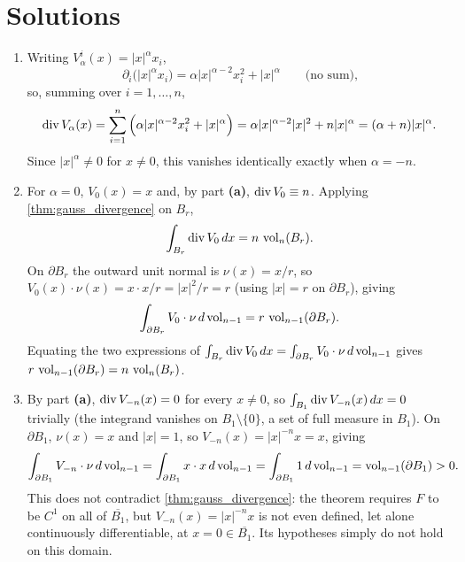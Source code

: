 
\section{Solutions}
\label{sec:flux_solutions}

\begin{exercisesolution}
\label{sol:radial_vector_fields_flux}
\begin{enumerate}[label=\textbf{(\alph*)}]
  \item Writing $V_\alpha^i(x) = \lvert x\rvert^\alpha x_i$,
    \[
    \partial_i\big(\lvert x\rvert^\alpha x_i\big) = \alpha\lvert x\rvert^{\alpha-2}x_i^2
      + \lvert x\rvert^\alpha \qquad \text{(no sum),}
    \]
    so, summing over $i=1,\ldots,n$,
    \[
    \operatorname{div} V_\alpha(x) = \sum_{i=1}^n \Big(\alpha\lvert x\rvert^{\alpha-2}x_i^2 + \lvert
      x\rvert^\alpha\Big) = \alpha\lvert x\rvert^{\alpha-2}\lvert x\rvert^2
      + n\lvert x\rvert^\alpha = (\alpha+n)\lvert x\rvert^\alpha.
    \]
    Since $\lvert x\rvert^\alpha \neq 0$ for $x\neq0$, this vanishes identically exactly when
    $\alpha = -n$.
  \item For $\alpha=0$, $V_0(x)=x$ and, by part \textbf{(a)}, $\operatorname{div} V_0 \equiv n$. Applying
    \cref{thm:gauss_divergence} on $B_r$,
    \[\int_{B_r} \operatorname{div} V_0\,dx = n\,\operatorname{vol}_n(B_r).\]
    On $\partial B_r$ the outward unit normal is $\nu(x) = x/r$, so $V_0(x)\cdot\nu(x) = x\cdot
    x/r = \lvert x\rvert^2/r = r$ (using $\lvert x\rvert=r$ on $\partial B_r$), giving
    \[\int_{\partial B_r} V_0\cdot\nu\,d\operatorname{vol}_{n-1} = r\,\operatorname{vol}_{n-1}(\partial B_r).\]
    Equating the two expressions of $\int_{B_r}\operatorname{div} V_0\,dx = \int_{\partial B_r}V_0\cdot\nu\,
    d\operatorname{vol}_{n-1}$ gives $r\,\operatorname{vol}_{n-1}(\partial B_r) = n\,\operatorname{vol}_n(B_r)$.
  \item By part \textbf{(a)}, $\operatorname{div} V_{-n}(x) = 0$ for every $x\neq0$, so $\int_{B_1}\operatorname{div}
    V_{-n}(x)\,dx = 0$ trivially (the integrand vanishes on $B_1\setminus\{0\}$, a set of full
    measure in $B_1$). On $\partial B_1$, $\nu(x)=x$ and $\lvert x\rvert=1$, so $V_{-n}(x) =
    \lvert x\rvert^{-n}x = x$, giving
    \[\int_{\partial B_1} V_{-n}\cdot\nu\,d\operatorname{vol}_{n-1} = \int_{\partial B_1} x\cdot x\,d\operatorname{vol}_{n-1}
      = \int_{\partial B_1} 1\,d\operatorname{vol}_{n-1} = \operatorname{vol}_{n-1}(\partial B_1) > 0.\]
    This does not contradict \cref{thm:gauss_divergence}: the theorem requires $F$ to be $C^1$ on
    all of $\overline{B_1}$, but $V_{-n}(x) = \lvert x\rvert^{-n}x$ is not even defined, let
    alone continuously differentiable, at $x=0 \in \overline{B_1}$. Its hypotheses simply do not
    hold on this domain.
\end{enumerate}
\end{exercisesolution}

